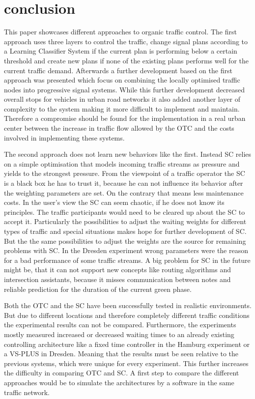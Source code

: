 \section{conclusion}
This paper showcases different approaches to organic traffic control. The first approach uses three layers to control the traffic, change signal plans according to a Learning Classifier System if the current plan is performing below a certain threshold and create new plans if none of the existing plans performs well for the current traffic demand. Afterwards a further development based on the first approach was presented which focus on combining the locally optimised traffic nodes into progressive signal systems. 
While this further development decreased overall stops for vehicles in urban road networks it also added another layer of complexity to the system making it more difficult to implement and maintain. Therefore a compromise should be found for the implementation in a real urban center between the increase in traffic flow allowed by the OTC and the costs involved in implementing these systems.


The second approach does not learn new behaviors like the first. Instead SC relies on a simple optimisation that models incoming traffic streams as pressure and yields to the strongest pressure. From the viewpoint of a traffic operator the SC is a black box he has to trust it, because he can not influence its behavior after the weighting parameters are set. On the contrary that means less maintenance costs. In the user's view the SC can seem chaotic, if he does not know its principles. The traffic participants would need to be cleared up about the SC to accept it. Particularly the possibilities to adjust the waiting weights for different types of traffic and special situations makes hope for further development of SC. But the the same possibilities to adjust the weights are the source for remaining problems with SC. In the Dresden experiment wrong parameters were the reason for a bad performance of some traffic streams. A big problem for SC in the future might be, that it can not support new concepts like routing algorithms and intersection assistants, because it misses communication between notes and reliable prediction for the duration of the current green phase.


Both the OTC and the SC have been successfully tested in realistic environments. But due to different locations and therefore completely different traffic conditions the experimental results can not be compared. Furthermore, the experiments mostly measured increased or decreased waiting times to an already existing controlling architecture like a fixed time controller in the Hamburg experiment or a VS-PLUS in Dresden. Meaning that the results must be seen relative to the previous systems, which were unique for every experiment. This further increases the difficulty in comparing OTC and SC. A first step to compare the different approaches would be to simulate the architectures by a software in the same traffic network.

